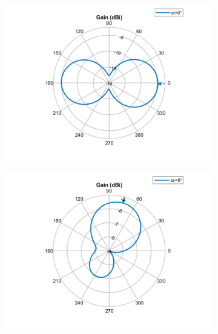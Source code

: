 \documentclass[12pt,a4paper]{article}
\begin{document}
{\begin{figure}[h]
\begin{center}
\begin{subfigure}{0.5\linewidth}
			\caption{}
		\end{subfigure}
		\begin{subfigure}{0.5\linewidth}
			\includegraphics[scale=0.5]{gain_azimuth_pifa.pdf}
		\caption{}	\end{subfigure}
		\begin{subfigure}{0.5\linewidth}
		\includegraphics[scale=0.5]{gain_elevation_pifa.pdf}
	\caption{}	\end{subfigure}
	\begin{subfigure}{0.5\linewidth}

\end{subfigure}
\end{center}
\end{figure}}
\end{document}
